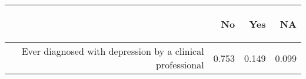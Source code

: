 \documentclass{article}\usepackage[]{graphicx}\usepackage[]{color}
\begin{document}
\begin{table}[ht]
\centering
\begin{tabular}{rrrr}
  \hline
 & \begin{sideways} No \end{sideways} & \begin{sideways} Yes \end{sideways} & \begin{sideways} NA \end{sideways} \\ 
  \hline
	Ever diagnosed with depression by a clinical professional & 0.753 & 0.149 & 0.099 \\ 
   \hline
\end{tabular}
\end{table}


\newpage
\end{document}
